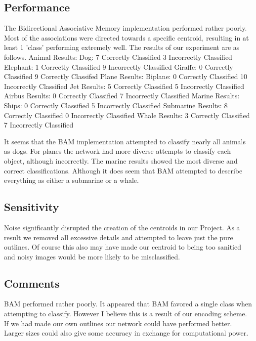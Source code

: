\documentclass{article}
\begin{document}
\subsection{Performance}
The Bidirectional Associative Memory implementation performed rather poorly.
Most of the associations were directed towards a specific centroid, resulting
in at least 1 'class' performing extremely well. The results of our
experiment are as follows.
Animal Results:
    Dog:
        7 Correctly Classified
        3 Incorrectly Classified
    Elephant:
        1 Correctly Classified
        9 Incorrectly Classified
    Giraffe:
        0 Correctly Classified
        9 Correctly Classifed
Plane Results:
    Biplane:
        0 Correctly Classified
        10 Incorrectly Classified
    Jet Results:
        5 Correctly Classified
        5 Incorrectly Classified
    Airbus Results:
        0 Correctly Classified
        7 Incorrectly Classified
Marine Results:
    Ships:
        0 Correctly Classified
        5 Incorrectly Classified
    Submarine Results:
        8 Correctly Classified
        0 Incorrectly Classified
    Whale Results:
        3 Correctly Classified
        7 Incorrectly Classified

It seems that the BAM implementation attempted to classify nearly all animals
as dogs. For planes the network had more diverse attempts to classify each
object, although incorrectly. The marine results showed the most diverse and
correct classifications. Although it does seem that BAM attempted to describe
everything as either a submarine or a whale.

\subsection{Sensitivity}
Noise significantly disrupted the creation of the centroids in our Project.
As a result we removed all excessive details and attempted to leave just
the pure outlines. Of course this also may have made our centroid to being
too sanitied and noisy images would be more likely to be misclassified.

\subsection{Comments}
BAM performed rather poorly. It appeared that BAM favored a single class when
attempting to classify. However I believe this is a result of our encoding 
scheme. If we had made our own outlines our network could have performed 
better. Larger sizes could also give some accuracy in exchange for computational
power. 
\end{document}
